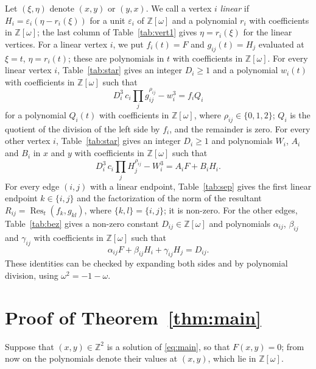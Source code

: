 \documentclass[11pt]{article}
\newcommand{\Z}{\mathbb{Z}}
\begin{document}
Let $(\xi,\eta)$ denote $(x,y)$ or $(y,x)$. We call a vertex $i$ \emph{linear} if $H_i=\varepsilon_i(\eta-r_i(\xi))$ for a unit $\varepsilon_i$ of $\Z[\omega]$ and a polynomial $r_i$ with coefficients in $\Z[\omega]$; the last column of Table~\ref{tab:vert1} gives $\eta=r_i(\xi)$ for the linear vertices. For a linear vertex $i$, we put $f_i(t)=F$ and $g_{ij}(t)=H_j$ evaluated at $\xi=t$, $\eta=r_i(t)$; these are polynomials in $t$ with coefficients in $\Z[\omega]$.
For every linear vertex $i$, Table~\ref{tab:star} gives an integer $D_i\geq1$ and a polynomial $w_i(t)$ with coefficients in $\Z[\omega]$ such that
\begin{equation}\label{eq:starlin}
D_i^3\,c_i\prod_jg_{ij}^{\rho_{ij}}-w_i^3=f_iQ_i
\end{equation}
for a polynomial $Q_i(t)$ with coefficients in $\Z[\omega]$, where $\rho_{ij}\in\{0,1,2\}$; $Q_i$ is the quotient of the division of the left side by $f_i$, and the remainder is zero.
For every other vertex $i$, Table~\ref{tab:star} gives an integer $D_i\geq1$ and polynomials $W_i$, $A_i$ and $B_i$ in $x$ and $y$ with coefficients in $\Z[\omega]$ such that
\begin{equation}\label{eq:star}
D_i^3\,c_i\prod_jH_j^{\rho_{ij}}-W_i^3=A_iF+B_iH_i.
\end{equation}
For every edge $(i,j)$ with a linear endpoint, Table~\ref{tab:sep} gives the first linear endpoint $k\in\{i,j\}$ and the factorization of the norm of the resultant $R_{ij}=\operatorname{Res}_t(f_k,g_{kl})$, where $\{k,l\}=\{i,j\}$; it is non-zero.
For the other edges, Table~\ref{tab:bez} gives a non-zero constant $D_{ij}\in\Z[\omega]$ and polynomials $\alpha_{ij}$, $\beta_{ij}$ and $\gamma_{ij}$ with coefficients in $\Z[\omega]$ such that
\begin{equation}\label{eq:sep}
\alpha_{ij}F+\beta_{ij}H_i+\gamma_{ij}H_j=D_{ij}.
\end{equation}
These identities can be checked by expanding both sides and by polynomial division, using $\omega^2=-1-\omega$.

\section{Proof of Theorem~\ref{thm:main}}

Suppose that $(x,y)\in\Z^2$ is a solution of \eqref{eq:main}, so that $F(x,y)=0$; from now on the polynomials denote their values at $(x,y)$, which lie in $\Z[\omega]$.
\end{document}
